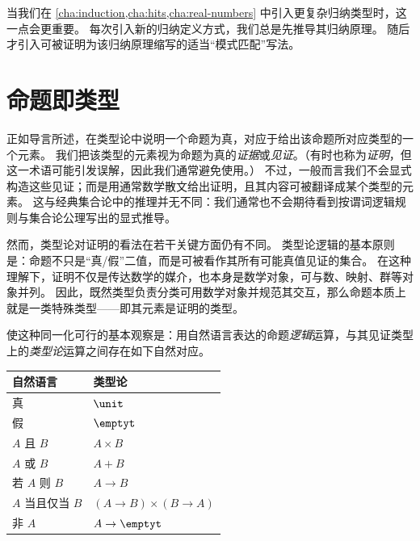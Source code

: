 当我们在 \cref{cha:induction,cha:hits,cha:real-numbers} 中引入更复杂归纳类型时，这一点会更重要。
每次引入新的归纳定义方式，我们总是先推导其归纳原理。
随后才引入可被证明为该归纳原理缩写的适当“模式匹配”写法。

%
%

\section{命题即类型}
\label{sec:pat}

%
%
正如导言所述，在类型论中说明一个命题为真，对应于给出该命题所对应类型的一个元素。
%
%
我们把该类型的元素视为命题为真的\emph{证据}或\emph{见证}。（有时也称为\emph{证明}，但这一术语可能引发误解，因此我们通常避免使用。）
不过，一般而言我们不会显式构造这些见证；而是用通常数学散文给出证明，且其内容可被翻译成某个类型的元素。
这与经典集合论中的推理并无不同：我们通常也不会期待看到按谓词逻辑规则与集合论公理写出的显式推导。

然而，类型论对证明的看法在若干关键方面仍有不同。
类型论逻辑的基本原则是：命题不只是“真/假”二值，而是可被看作其所有可能真值见证的集合。
在这种理解下，证明不仅是传达数学的媒介，也本身是数学对象，可与数、映射、群等对象并列。
因此，既然类型负责分类可用数学对象并规范其交互，那么命题本质上就是一类特殊类型——即其元素是证明的类型。

%
%
使这种同一化可行的基本观察是：用自然语言表达的命题\emph{逻辑}运算，与其见证类型上的\emph{类型论}运算之间存在如下自然对应。
%
%
%
%
%
\begin{center}
\medskip
\begin{tabular}{ll}
  \toprule
  自然语言 & 类型论\\
  \midrule
  真 & $\unit$ \\
  假 & $\emptyt$ \\
  $A$ 且 $B$ & $A \times B$ \\
  $A$ 或 $B$ & $A + B$ \\
  若 $A$ 则 $B$ & $A \to B$ \\
  $A$ 当且仅当 $B$ & $(A \to B) \times (B \to A)$ \\
  非 $A$ &  $A \to \emptyt$ \\
  \bottomrule
\end{tabular}
\medskip
\end{center}

